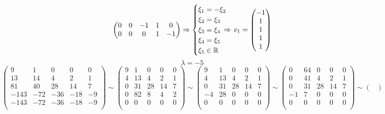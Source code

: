 \documentclass{article}
\newcommand{\la}{\lambda}
\newcommand{\shiftleft}[3]{\makebox[#1][r]{\makebox[#2][l]{#3}}}
\begin{document}
\begin{center}
$$\begin{pmatrix}
0 & 0 & -1 & 1 & 0 \\
0 & 0 & 0 & 1 & -1
\end{pmatrix} \Rightarrow \begin{cases}
\xi_1 = -\xi_2 \\
\xi_2 = \xi_3 \\
\xi_3 = \xi_4 \\
\xi_4 = \xi_5 \\
\xi_5 \in \mathbb{R}
\end{cases} \shiftleft{-2pt}{14pt}{$\Rightarrow$} v_1 = \begin{pmatrix}
-1 \\ 1 \\ 1 \\ 1 \\ 1
\end{pmatrix}$$
$$\la = -5$$
$$\begin{pmatrix}
9 & 1 & 0 & 0 & 0 \\
13 & 14 & 4 & 2 & 1 \\
81 & 40 & 28 & 14 & 7 \\
-143 & -72 & -36 & -18 & -9 \\
-143 & -72 & -36 & -18 & -9 \\
\end{pmatrix} \sim \begin{pmatrix}
9 & 1 & 0 & 0 & 0 \\
4 & 13 & 4 & 2 & 1 \\
0 & 31 & 28 & 14 & 7 \\
0 & 82 & 8 & 4 & 2 \\
0 & 0 & 0 & 0 & 0 \\
\end{pmatrix} \sim \begin{pmatrix}
9 & 1 & 0 & 0 & 0 \\
4 & 13 & 4 & 2 & 1 \\
0 & 31 & 28 & 14 & 7 \\
-4 & 28 & 0 & 0 & 0 \\
0 & 0 & 0 & 0 & 0 \\
\end{pmatrix} \sim \begin{pmatrix}
0 & 64 & 0 & 0 & 0 \\
0 & 41 & 4 & 2 & 1 \\
0 & 31 & 28 & 14 & 7 \\
-1 & 7 & 0 & 0 & 0 \\
0 & 0 & 0 & 0 & 0 \\
\end{pmatrix} \sim \begin{pmatrix}

\end{pmatrix}$$
\end{center}
\end{document}
